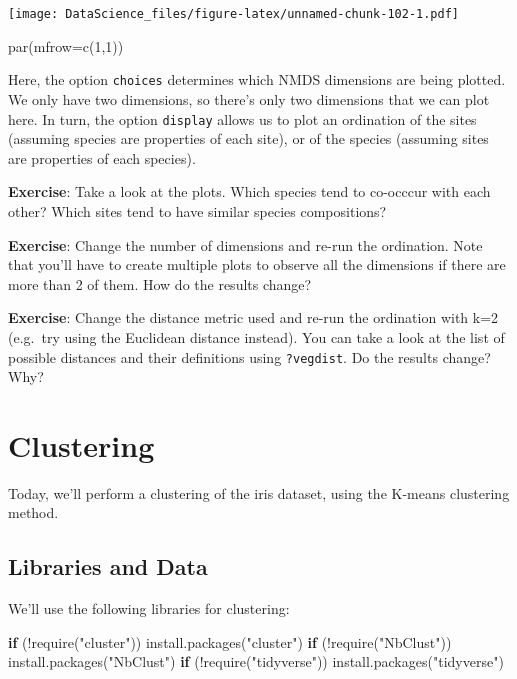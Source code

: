 \documentclass[
]{book}
\newenvironment{Shaded}{\begin{snugshade}}{\end{snugshade}}
\newcommand{\AttributeTok}[1]{\textcolor[rgb]{0.77,0.63,0.00}{#1}}
\newcommand{\ControlFlowTok}[1]{\textcolor[rgb]{0.13,0.29,0.53}{\textbf{#1}}}
\newcommand{\DecValTok}[1]{\textcolor[rgb]{0.00,0.00,0.81}{#1}}
\newcommand{\FunctionTok}[1]{\textcolor[rgb]{0.00,0.00,0.00}{#1}}
\newcommand{\NormalTok}[1]{#1}
\newcommand{\SpecialCharTok}[1]{\textcolor[rgb]{0.00,0.00,0.00}{#1}}
\newcommand{\StringTok}[1]{\textcolor[rgb]{0.31,0.60,0.02}{#1}}
\begin{document}
\texttt{[image: DataScience\_files/figure-latex/unnamed-chunk-102-1.pdf]}

\begin{Shaded}
\begin{Highlighting}[]
\FunctionTok{par}\NormalTok{(}\AttributeTok{mfrow=}\FunctionTok{c}\NormalTok{(}\DecValTok{1}\NormalTok{,}\DecValTok{1}\NormalTok{))}
\end{Highlighting}
\end{Shaded}

Here, the option \texttt{choices} determines which NMDS dimensions are being plotted. We only have two dimensions, so there's only two dimensions that we can plot here. In turn, the option \texttt{display} allows us to plot an ordination of the sites (assuming species are properties of each site), or of the species (assuming sites are properties of each species).

\textbf{Exercise}: Take a look at the plots. Which species tend to co-occcur with each other? Which sites tend to have similar species compositions?

\textbf{Exercise}: Change the number of dimensions and re-run the ordination. Note that you'll have to create multiple plots to observe all the dimensions if there are more than 2 of them. How do the results change?

\textbf{Exercise}: Change the distance metric used and re-run the ordination with k=2 (e.g.~try using the Euclidean distance instead). You can take a look at the list of possible distances and their definitions using \texttt{?vegdist}. Do the results change? Why?

\hypertarget{clustering}{%
\chapter{Clustering}\label{clustering}}

Today, we'll perform a clustering of the iris dataset, using the K-means clustering method.

\hypertarget{libraries-and-data-1}{%
\section{Libraries and Data}\label{libraries-and-data-1}}

We'll use the following libraries for clustering:

\begin{Shaded}
\begin{Highlighting}[]
\ControlFlowTok{if}\NormalTok{ (}\SpecialCharTok{!}\FunctionTok{require}\NormalTok{(}\StringTok{"cluster"}\NormalTok{)) }\FunctionTok{install.packages}\NormalTok{(}\StringTok{"cluster"}\NormalTok{)}
\ControlFlowTok{if}\NormalTok{ (}\SpecialCharTok{!}\FunctionTok{require}\NormalTok{(}\StringTok{"NbClust"}\NormalTok{)) }\FunctionTok{install.packages}\NormalTok{(}\StringTok{"NbClust"}\NormalTok{)}
\ControlFlowTok{if}\NormalTok{ (}\SpecialCharTok{!}\FunctionTok{require}\NormalTok{(}\StringTok{"tidyverse"}\NormalTok{)) }\FunctionTok{install.packages}\NormalTok{(}\StringTok{"tidyverse"}\NormalTok{)}
\end{Highlighting}
\end{Shaded}
\end{document}
